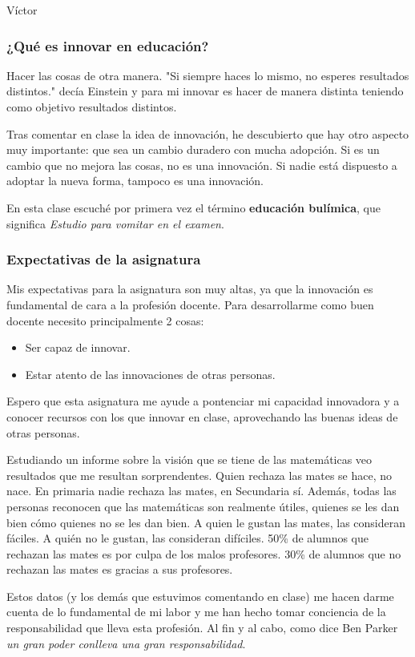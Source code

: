 \begin{opin}{\victorcolor}{Víctor}

\subsubsection{¿Qué es innovar en educación?}

Hacer las cosas de otra manera. "Si siempre haces lo mismo, no esperes resultados distintos." decía Einstein y para mi innovar es hacer de manera distinta teniendo como objetivo resultados distintos.


Tras comentar en clase la idea de innovación, he descubierto que hay otro aspecto muy importante: que sea un cambio duradero con mucha adopción.
%
Si es un cambio que no mejora las cosas, no es una innovación. 
%
Si nadie está dispuesto a adoptar la nueva forma, tampoco es una innovación.

En esta clase escuché por primera vez el término \textbf{educación bulímica}, que significa \textit{Estudio para vomitar en el examen}.


\subsubsection{Expectativas de la asignatura}


Mis expectativas para la asignatura son muy altas, ya que la innovación es fundamental de cara a la profesión docente.
%
Para desarrollarme como buen docente necesito principalmente 2 cosas:
\begin{itemize}
	\item Ser capaz de innovar.
 	\item Estar atento de las innovaciones de otras personas.
 \end{itemize} 

Espero que esta asignatura me ayude a pontenciar mi capacidad innovadora y a conocer recursos con los que innovar en clase, aprovechando las buenas ideas de otras personas.


Estudiando un informe sobre la visión que se tiene de las matemáticas veo resultados que me resultan sorprendentes. 
%
Quien rechaza las mates se hace, no nace. En primaria nadie rechaza las mates, en Secundaria sí.
%
Además, todas las personas reconocen que las matemáticas son realmente útiles, quienes se les dan bien cómo quienes no se les dan bien.
%
A quien le gustan las mates, las consideran fáciles. A quién no le gustan, las consideran difíciles. 50\% de alumnos que rechazan las mates es por culpa de los malos profesores. 30\% de alumnos que no rechazan las mates es gracias a sus profesores. 

Estos datos (y los demás que estuvimos comentando en clase) me hacen darme cuenta de lo fundamental de mi labor y me han hecho tomar conciencia de la responsabilidad que lleva esta profesión. Al fin y al cabo, como dice Ben Parker \textit{un gran poder conlleva una gran responsabilidad}.


\end{opin}

